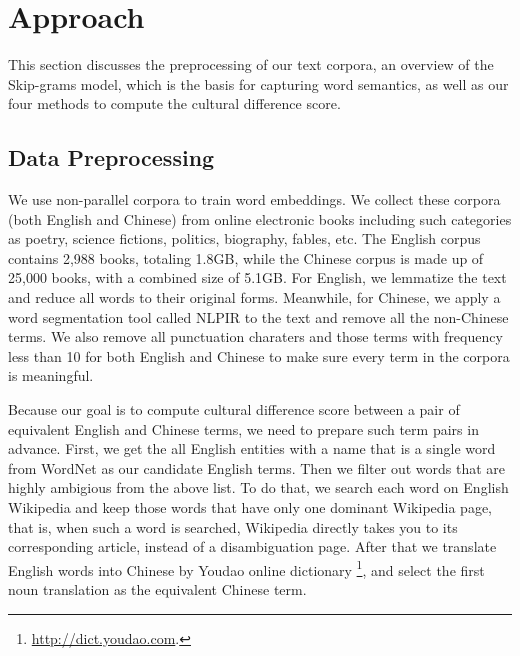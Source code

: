 \section{Approach}
\label{sec:approach}
This section discusses the preprocessing of our text corpora,
an overview of the Skip-grams model, which is the basis for capturing
word semantics, as well as our four methods
to compute the cultural difference score.

\subsection{Data Preprocessing}
\label{sec:data}

We use non-parallel corpora to train word embeddings.
We collect these corpora (both English and Chinese) from online
electronic books including such categories as poetry,
science fictions, politics, biography, fables, etc.
The English corpus contains 2,988 books, totaling 1.8GB, while the
Chinese corpus is made up of 25,000 books, with a combined size of 5.1GB.
For English, we lemmatize the text
and reduce all words to their original forms.
Meanwhile, for Chinese, we apply a word segmentation tool
called NLPIR \cite{NLPIR} to the text and remove all the non-Chinese terms.
We also remove all punctuation charaters and those terms with
frequency less than 10 for both English and Chinese to make
sure every term in the corpora is meaningful.


Because our goal is to compute cultural difference score between a
pair of equivalent English and Chinese terms, we need to prepare such
term pairs in advance.
First, we get the all English entities with a name that is a
single word from WordNet as our candidate English terms.
Then we filter out words that are highly ambigious from the above list.
To do that, we search each word on English Wikipedia and
keep those words that have only one dominant Wikipedia page, that is,
when such a word is searched, Wikipedia directly takes you to
its corresponding article, instead of a disambiguation page.
After that we translate English words into Chinese by Youdao online
dictionary \footnote{\url{http://dict.youdao.com}.}, and select the first noun translation as
the equivalent Chinese term.

